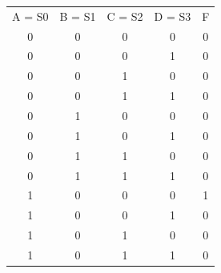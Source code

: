 \documentclass{article}
\begin{document}
\begin{table}[!htb]
\centering
\begin{tabular}{c|c|c|c|c}
{\color[HTML]{000000} A = S0} & {\color[HTML]{000000} B = S1} & {\color[HTML]{000000} C = S2} & {\color[HTML]{000000} D = S3} & {\color[HTML]{000000} F} \\
{\color[HTML]{000000} 0}      & {\color[HTML]{000000} 0}      & {\color[HTML]{000000} 0}      & {\color[HTML]{000000} 0}      & {\color[HTML]{000000} 0} \\
{\color[HTML]{000000} 0}      & {\color[HTML]{000000} 0}      & {\color[HTML]{000000} 0}      & {\color[HTML]{000000} 1}      & {\color[HTML]{000000} 0} \\
{\color[HTML]{000000} 0}      & {\color[HTML]{000000} 0}      & {\color[HTML]{000000} 1}      & {\color[HTML]{000000} 0}      & {\color[HTML]{000000} 0} \\
{\color[HTML]{000000} 0}      & {\color[HTML]{000000} 0}      & {\color[HTML]{000000} 1}      & {\color[HTML]{000000} 1}      & {\color[HTML]{000000} 0} \\
{\color[HTML]{000000} 0}      & {\color[HTML]{000000} 1}      & {\color[HTML]{000000} 0}      & {\color[HTML]{000000} 0}      & {\color[HTML]{000000} 0} \\
{\color[HTML]{000000} 0}      & {\color[HTML]{000000} 1}      & {\color[HTML]{000000} 0}      & {\color[HTML]{000000} 1}      & {\color[HTML]{000000} 0} \\
{\color[HTML]{000000} 0}      & {\color[HTML]{000000} 1}      & {\color[HTML]{000000} 1}      & {\color[HTML]{000000} 0}      & {\color[HTML]{000000} 0} \\
{\color[HTML]{000000} 0}      & {\color[HTML]{000000} 1}      & {\color[HTML]{000000} 1}      & {\color[HTML]{000000} 1}      & {\color[HTML]{000000} 0} \\
{\color[HTML]{000000} 1}      & {\color[HTML]{000000} 0}      & {\color[HTML]{000000} 0}      & {\color[HTML]{000000} 0}      & {\color[HTML]{000000} 1} \\
{\color[HTML]{000000} 1}      & {\color[HTML]{000000} 0}      & {\color[HTML]{000000} 0}      & {\color[HTML]{000000} 1}      & {\color[HTML]{000000} 0} \\
{\color[HTML]{000000} 1}      & {\color[HTML]{000000} 0}      & {\color[HTML]{000000} 1}      & {\color[HTML]{000000} 0}      & {\color[HTML]{000000} 0} \\
{\color[HTML]{000000} 1}      & {\color[HTML]{000000} 0}      & {\color[HTML]{000000} 1}      & {\color[HTML]{000000} 1}      & {\color[HTML]{000000} 0} \\

\end{tabular}
\end{table}
\end{document}
